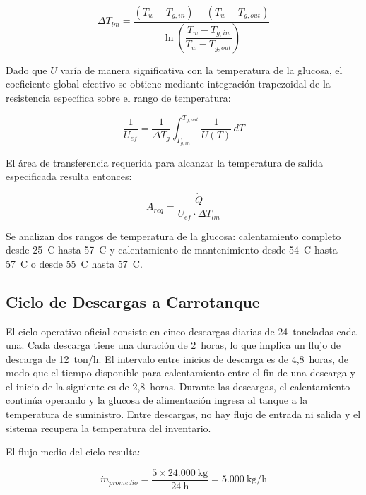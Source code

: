 \begin{equation}
\Delta T_{lm} = \frac{(T_w - T_{g,in}) - (T_w - T_{g,out})}{\ln\!\left(\dfrac{T_w - T_{g,in}}{T_w - T_{g,out}}\right)}
\label{eq:LMTD_continuo}
\end{equation}

Dado que $U$ var\'ia de manera significativa con la temperatura de la glucosa, el coeficiente global efectivo se obtiene mediante integraci\'on trapezoidal de la resistencia espec\'ifica sobre el rango de temperatura:

\begin{equation}
\frac{1}{U_{ef}} = \frac{1}{\Delta T_{g}} \int_{T_{g,in}}^{T_{g,out}} \frac{1}{U(T)} \, dT
\label{eq:U_efectivo}
\end{equation}

El \'area de transferencia requerida para alcanzar la temperatura de salida especificada resulta entonces:

\begin{equation}
A_{req} = \frac{\dot{Q}}{U_{ef} \cdot \Delta T_{lm}}
\label{eq:area_requerida}
\end{equation}

Se analizan dos rangos de temperatura de la glucosa: calentamiento completo desde 25~\textdegree C hasta 57~\textdegree C y calentamiento de mantenimiento desde 54~\textdegree C hasta 57~\textdegree C o desde 55~\textdegree C hasta 57~\textdegree C.

\subsection{Ciclo de Descargas a Carrotanque}

El ciclo operativo oficial consiste en cinco descargas diarias de 24~toneladas cada una. Cada descarga tiene una duraci\'on de 2~horas, lo que implica un flujo de descarga de 12~ton/h. El intervalo entre inicios de descarga es de 4,8~horas, de modo que el tiempo disponible para calentamiento entre el fin de una descarga y el inicio de la siguiente es de 2,8~horas. Durante las descargas, el calentamiento contin\'ua operando y la glucosa de alimentaci\'on ingresa al tanque a la temperatura de suministro. Entre descargas, no hay flujo de entrada ni salida y el sistema recupera la temperatura del inventario.

El flujo medio del ciclo resulta:

\begin{equation}
\dot{m}_{promedio} = \frac{5 \times 24{.}000~\text{kg}}{24~\text{h}} = 5{.}000~\text{kg/h}
\end{equation}

